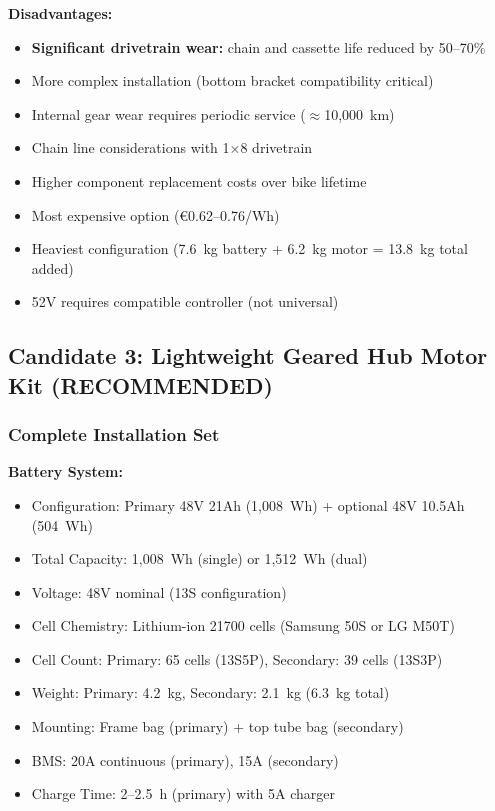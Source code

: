 \documentclass[12pt,a4paper]{article}
\begin{document}
\textbf{Disadvantages:}
\begin{itemize}
    \item \textbf{Significant drivetrain wear:} chain and cassette life reduced by 50--70\%
    \item More complex installation (bottom bracket compatibility critical)
    \item Internal gear wear requires periodic service ($\approx$10,000~km)
    \item Chain line considerations with 1×8 drivetrain
    \item Higher component replacement costs over bike lifetime
    \item Most expensive option (€0.62--0.76/Wh)
    \item Heaviest configuration (7.6~kg battery + 6.2~kg motor = 13.8~kg total added)
    \item 52V requires compatible controller (not universal)
\end{itemize}

\subsection{Candidate 3: Lightweight Geared Hub Motor Kit (\textbf{RECOMMENDED})}

\subsubsection{Complete Installation Set}

\textbf{Battery System:}
\begin{itemize}
    \item Configuration: Primary 48V 21Ah (1,008~Wh) + optional 48V 10.5Ah (504~Wh)
    \item Total Capacity: 1,008~Wh (single) or 1,512~Wh (dual)
    \item Voltage: 48V nominal (13S configuration)
    \item Cell Chemistry: Lithium-ion 21700 cells (Samsung 50S or LG M50T) \cite{samsung-50s, lg-m50t}
    \item Cell Count: Primary: 65 cells (13S5P), Secondary: 39 cells (13S3P)
    \item Weight: Primary: 4.2~kg, Secondary: 2.1~kg (6.3~kg total)
    \item Mounting: Frame bag (primary) + top tube bag (secondary)
    \item BMS: 20A continuous (primary), 15A (secondary)
    \item Charge Time: 2--2.5~h (primary) with 5A charger
\end{itemize}
\end{document}
